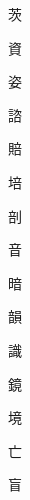 \begin{spacing}{2.5}
{\Huge \begin{CJK}{UTF8}{min} 茨\end{CJK}}\hspace{0.1cm}
{\Huge \begin{CJK}{UTF8}{min} 資\end{CJK}}\hspace{0.1cm}
{\Huge \begin{CJK}{UTF8}{min} 姿\end{CJK}}\hspace{0.1cm}
{\Huge \begin{CJK}{UTF8}{min} 諮\end{CJK}}\hspace{0.1cm}
{\Huge \begin{CJK}{UTF8}{min} 賠\end{CJK}}\hspace{0.1cm}
{\Huge \begin{CJK}{UTF8}{min} 培\end{CJK}}\hspace{0.1cm}
{\Huge \begin{CJK}{UTF8}{min} 剖\end{CJK}}\hspace{0.1cm}
{\Huge \begin{CJK}{UTF8}{min} 音\end{CJK}}\hspace{0.1cm}
{\Huge \begin{CJK}{UTF8}{min} 暗\end{CJK}}\hspace{0.1cm}
{\Huge \begin{CJK}{UTF8}{min} 韻\end{CJK}}\hspace{0.1cm}
{\Huge \begin{CJK}{UTF8}{min} 識\end{CJK}}\hspace{0.1cm}
{\Huge \begin{CJK}{UTF8}{min} 鏡\end{CJK}}\hspace{0.1cm}
{\Huge \begin{CJK}{UTF8}{min} 境\end{CJK}}\hspace{0.1cm}
{\Huge \begin{CJK}{UTF8}{min} 亡\end{CJK}}\hspace{0.1cm}
{\Huge \begin{CJK}{UTF8}{min} 盲\end{CJK}}\hspace{0.1cm}

\end{spacing}

